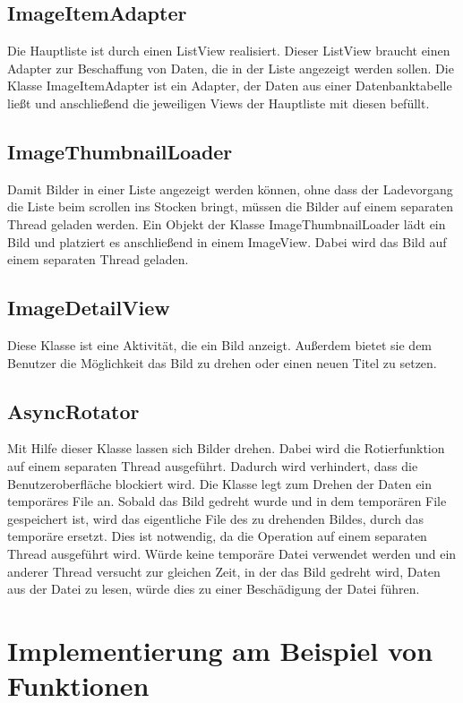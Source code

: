 \subsection{ImageItemAdapter}
Die Hauptliste ist durch einen ListView realisiert.
Dieser ListView braucht einen Adapter zur Beschaffung von Daten, die in der Liste angezeigt werden sollen.
Die Klasse ImageItemAdapter ist ein Adapter, der Daten aus einer Datenbanktabelle ließt
und anschließend die jeweiligen Views der Hauptliste mit diesen befüllt.

\subsection{ImageThumbnailLoader}
Damit Bilder in einer Liste angezeigt werden können,
ohne dass der Ladevorgang die Liste beim scrollen ins Stocken bringt, 
müssen die Bilder auf einem separaten Thread geladen werden.
Ein Objekt der Klasse ImageThumbnailLoader lädt ein Bild und platziert es anschließend
in einem ImageView.
Dabei wird das Bild auf einem separaten Thread geladen. 

\subsection{ImageDetailView}
Diese Klasse ist eine Aktivität, die ein Bild anzeigt. 
Außerdem bietet sie dem Benutzer die Möglichkeit das Bild zu drehen oder einen neuen Titel zu setzen.

\subsection{AsyncRotator}
Mit Hilfe dieser Klasse lassen sich Bilder drehen. 
Dabei wird die Rotierfunktion auf einem separaten Thread ausgeführt.
Dadurch wird verhindert, dass die Benutzeroberfläche blockiert wird.
Die Klasse legt zum Drehen der Daten ein temporäres File an.
Sobald das Bild gedreht wurde und in dem temporären File gespeichert ist, 
wird das eigentliche File des zu drehenden Bildes, durch das temporäre ersetzt.
Dies ist notwendig, da die Operation auf einem separaten Thread ausgeführt wird.
Würde keine temporäre Datei verwendet werden und ein anderer Thread versucht 
zur gleichen Zeit, in der das Bild gedreht wird, Daten aus der Datei zu lesen,
würde dies zu einer Beschädigung der Datei führen.

\section{Implementierung am Beispiel von Funktionen}

